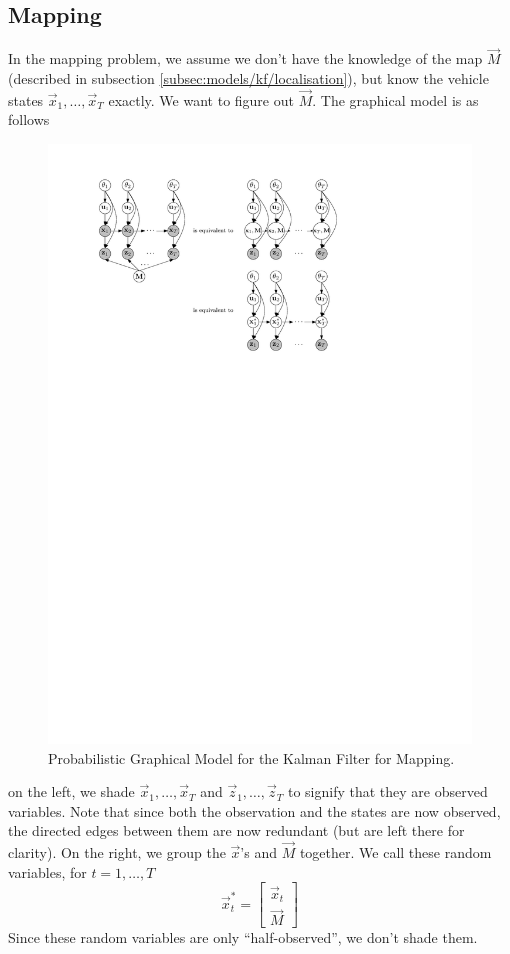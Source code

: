\subsection{Mapping}
\label{sec:models/kf/mapping}
In the mapping problem, we assume we don't have the knowledge of the map $\vec M$ (described in subsection \ref{subsec:models/kf/localisation}), but know the vehicle states $\vec x_1, \dotsc, \vec x_T$ exactly. We want to figure out $\vec M$. The graphical model is as follows
\begin{figure}[!htb]
\centering
\includegraphics[scale=1]{models/kf/figures/kf-map}
\caption{Probabilistic Graphical Model for the Kalman Filter for Mapping.}
\label{fig:models/kf/figures/kf-map}
\end{figure}

on the left, we shade $\vec x_1, \dotsc, \vec x_T$ and $\vec z_1, \dotsc, \vec z_T$ to signify that they are observed variables. Note that since both the observation and the states are now observed, the directed edges between them are now redundant (but are left there for clarity). On the right, we group the $\vec x$'s and $\vec M$ together. We call these random variables, for $t = 1, \dotsc, T$
\begin{equation}
	\vec x_t^\ast =
		\begin{bmatrix}
			\vec x_t \\
			\vec M
		\end{bmatrix}
\end{equation}
Since these random variables are only ``half-observed'', we don't shade them.

